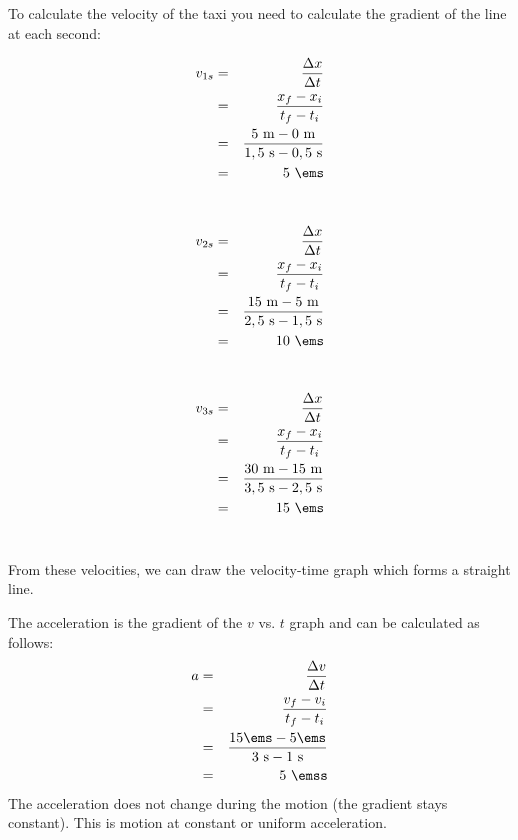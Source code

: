 To calculate the velocity of the taxi you need to calculate the gradient of the line at each second:\\
\begin{minipage}{0.33\textwidth}
\begin{eqnarray*}
{v_{1s}}&=&\frac{\Delta x}{\Delta t}\\
&=&\frac{x_f - x_i}{ t_f - t_i }\\
&=&\frac{5\rm{~m} - 0\rm{~m}}{1,5\rm{~s} - 0,5\rm{~s}}\\
&=&5\ \ems
\end{eqnarray*}\\
\end{minipage}
\begin{minipage}{0.33\textwidth}
\begin{eqnarray*}
{v_{2s}}&=&\frac{\Delta x}{\Delta t}\\
&=&\frac{x_f - x_i}{ t_f - t_i }\\
&=&\frac{15\rm{~m} - 5\rm{~m}}{2,5\rm{~s} - 1,5\rm{~s}}\\
&=&10\ \ems
\end{eqnarray*}\\
\end{minipage}
\begin{minipage}{0.33\textwidth}
\begin{eqnarray*}
{v_{3s}}&=&\frac{\Delta x}{\Delta t}\\
&=&\frac{x_f - x_i}{ t_f - t_i }\\
&=&\frac{30\rm{~m} - 15\rm{~m}}{3,5\rm{~s} - 2,5\rm{~s}}\\
&=&15\ \ems
\end{eqnarray*}\\
\end{minipage}

From these velocities, we can draw the velocity-time graph which forms a straight line. 

The acceleration is the gradient of the $v$ vs. $t$ graph and can be calculated as follows:\\
\begin{eqnarray*}
{a}&=&\frac{\Delta v}{\Delta t}\\
&=&\frac{v_f - v_i}{ t_f - t_i }\\
&=&\frac{15 \ems - 5\ems}{3\rm{~s} - 1\rm{~s}}\\
&=&5\ \emss
\end{eqnarray*}
The acceleration does not change during the motion (the gradient stays constant). This is motion at constant or uniform acceleration.

